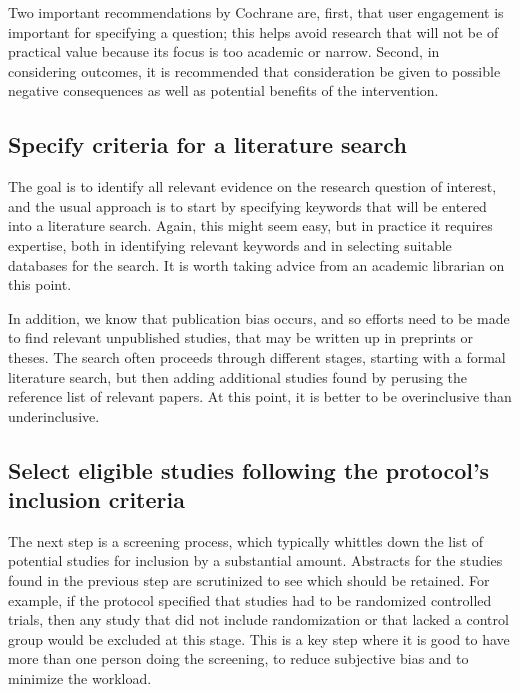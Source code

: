 \documentclass{krantz}
\begin{document}
Two important recommendations by Cochrane are, first, that user engagement is important for specifying a question; this helps avoid research that will not be of practical value because its focus is too academic or narrow. Second, in considering outcomes, it is recommended that consideration be given to possible negative consequences as well as potential benefits of the intervention.

\hypertarget{specify-criteria-for-a-literature-search}{%
\subsection{Specify criteria for a literature search}\label{specify-criteria-for-a-literature-search}}

The goal is to identify all relevant evidence on the research question of interest, and the usual approach is to start by specifying keywords that will be entered into a literature search. Again, this might seem easy, but in practice it requires expertise, both in identifying relevant keywords and in selecting suitable databases for the search. It is worth taking advice from an academic librarian on this point.

In addition, we know that publication bias occurs, and so efforts need to be made to find relevant unpublished studies, that may be written up in preprints or theses. The search often proceeds through different stages, starting with a formal literature search, but then adding additional studies found by perusing the reference list of relevant papers. At this point, it is better to be overinclusive than underinclusive.

\hypertarget{select-eligible-studies-following-protocols-inclusion-criteria}{%
\subsection{Select eligible studies following the protocol's inclusion criteria}\label{select-eligible-studies-following-protocols-inclusion-criteria}}

The next step is a screening process, which typically whittles down the list of potential studies for inclusion by a substantial amount. Abstracts for the studies found in the previous step are scrutinized to see which should be retained. For example, if the protocol specified that studies had to be randomized controlled trials, then any study that did not include randomization or that lacked a control group would be excluded at this stage. This is a key step where it is good to have more than one person doing the screening, to reduce subjective bias and to minimize the workload.
\end{document}
